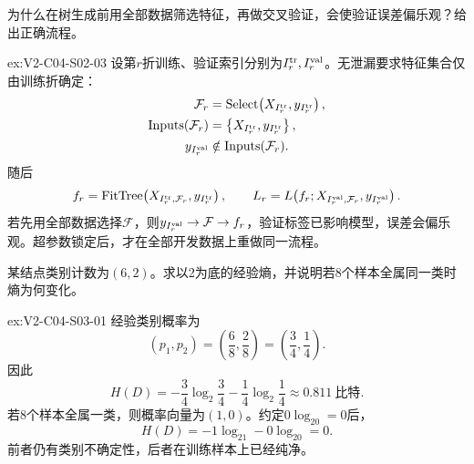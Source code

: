 \begin{SLChapterExercisePairSection}
\begin{exercise}\label{ex:V2-C04-S02-03}
为什么在树生成前用全部数据筛选特征，再做交叉验证，会使验证误差偏乐观？给出正确流程。
\end{exercise}
\ifSLFullEdition
{}\label{sol:V2-C04-S02-03}
\begin{chapterexercisesolution}{ex:V2-C04-S02-03}
设第$r$折训练、验证索引分别为$I_r^{\rm tr},I_r^{\rm val}$。无泄漏要求特征集合仅由训练折确定：
\[
\begin{aligned}
\mathcal F_r
  &=\operatorname{Select}\!\left(X_{I_r^{\rm tr}},y_{I_r^{\rm tr}}\right),\\
\operatorname{Inputs}(\mathcal F_r)
  &=\left\{X_{I_r^{\rm tr}},y_{I_r^{\rm tr}}\right\},\\
y_{I_r^{\rm val}}
  &\notin\operatorname{Inputs}(\mathcal F_r).
\end{aligned}
\]
随后
\[
f_r=\operatorname{FitTree}\!\left(X_{I_r^{\rm tr},\mathcal F_r},y_{I_r^{\rm tr}}\right),
\qquad
L_r=L\!\left(f_r;X_{I_r^{\rm val},\mathcal F_r},y_{I_r^{\rm val}}\right).
\]
若先用全部数据选择$\mathcal F$，则$y_{I_r^{\rm val}}\to\mathcal F\to f_r$，验证标签已影响模型，误差会偏乐观。超参数锁定后，才在全部开发数据上重做同一流程。
\end{chapterexercisesolution}
\fi

\begin{exercise}\label{ex:V2-C04-S03-01}
某结点类别计数为$(6,2)$。求以2为底的经验熵，并说明若8个样本全属同一类时熵为何变化。
\end{exercise}
\ifSLFullEdition
{}\label{sol:V2-C04-S03-01}
\begin{chapterexercisesolution}{ex:V2-C04-S03-01}
经验类别概率为
\[
(p_1,p_2)=\left(\frac68,\frac28\right)=\left(\frac34,\frac14\right).
\]
因此
\[
H(D)
=-\frac34\log_2\frac34-\frac14\log_2\frac14
\approx0.811\ \text{比特}.
\]
若8个样本全属一类，则概率向量为$(1,0)$。约定$0\log_20=0$后，
\[
H(D)=-1\log_21-0\log_20=0.
\]
前者仍有类别不确定性，后者在训练样本上已经纯净。
\end{chapterexercisesolution}
\fi


\end{SLChapterExercisePairSection}
